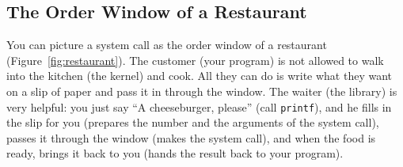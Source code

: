 \subsection{The Order Window of a Restaurant}

You can picture a system call as the order window of a restaurant (Figure~\ref{fig:restaurant}). The customer (your program) is not allowed to walk into the kitchen (the kernel) and cook. All they can do is write what they want on a slip of paper and pass it in through the window. The waiter (the library) is very helpful: you just say ``A cheeseburger, please'' (call \texttt{printf}), and he fills in the slip for you (prepares the number and the arguments of the system call), passes it through the window (makes the system call), and when the food is ready, brings it back to you (hands the result back to your program).


